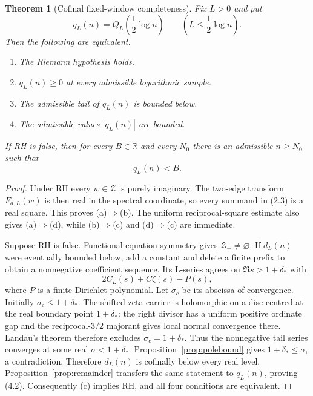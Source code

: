 \documentclass[11pt]{article}
\newtheorem{theorem}{Theorem}[section]
\newcommand{\R}{\mathbb R}
\newcommand{\cZ}{\mathcal Z}
\begin{document}
\begin{theorem}[Cofinal fixed-window completeness]\label{thm:completeness}
Fix $L>0$ and put
\[
  q_L(n)=Q_L\!\left(\frac12\log n\right)
  \qquad\left(L\le\frac12\log n\right).
  \tag{4.1}
\]
Then the following are equivalent.
\begin{enumerate}[label=(\alph*)]
\item The Riemann hypothesis holds.
\item $q_L(n)\ge0$ at every admissible logarithmic sample.
\item The admissible tail of $q_L(n)$ is bounded below.
\item The admissible values $|q_L(n)|$ are bounded.
\end{enumerate}
If RH is false, then for every $B\in\R$ and every $N_0$ there is an admissible $n\ge N_0$ such
that
\[
  q_L(n)<B.
  \tag{4.2}
\]
\end{theorem}

\begin{proof}
Under RH every $w\in\cZ$ is purely imaginary.  The two-edge transform $F_{a,L}(w)$ is then real
in the spectral coordinate, so every summand in (2.3) is a real square.  This proves (a)$\Rightarrow$(b).
The uniform reciprocal-square estimate also gives (a)$\Rightarrow$(d), while (b)$\Rightarrow$(c)
and (d)$\Rightarrow$(c) are immediate.

Suppose RH is false.  Functional-equation symmetry gives $\cZ_+\ne\varnothing$.  If $d_L(n)$
were eventually bounded below, add a constant and delete a finite prefix to obtain a nonnegative
coefficient sequence.  Its L-series agrees on $\Re s>1+\delta_*$ with
\[
  2C_L(s)+C\zeta(s)-P(s),
  \tag{4.3}
\]
where $P$ is a finite Dirichlet polynomial.  Let $\sigma_c$ be its abscissa of convergence.
Initially $\sigma_c\le1+\delta_*$.  The shifted-zeta carrier is holomorphic on a disc centred at
the real boundary point $1+\delta_*$: the right divisor has a uniform positive ordinate gap and
the reciprocal-$3/2$ majorant gives local normal convergence there.  Landau's theorem therefore
excludes $\sigma_c=1+\delta_*$.  Thus the nonnegative tail series converges at some real
$\sigma<1+\delta_*$.  Proposition~\ref{prop:polebound} gives
$1+\delta_*\le\sigma$, a contradiction.  Therefore $d_L(n)$ is cofinally below every real
level.  Proposition~\ref{prop:remainder} transfers the same statement to $q_L(n)$, proving
(4.2).  Consequently (c) implies RH, and all four conditions are equivalent.
\end{proof}
\end{document}
